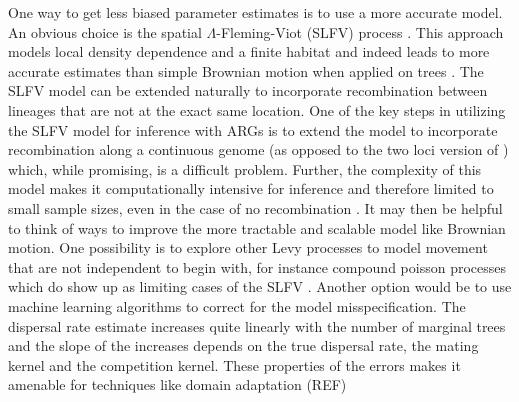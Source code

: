 One way to get less biased parameter estimates is to use a more accurate model. An obvious choice is the spatial $\Lambda$-Fleming-Viot (SLFV) process \citep{barton2010new,barton2010newEvol}. This approach models local density dependence and a finite habitat and indeed leads to more accurate estimates than simple Brownian motion when applied on trees \citep{kalkauskas2021sampling}. The SLFV model can be extended naturally to incorporate recombination \citep{barton2010newEvol,etheridge2012spatial} between lineages that are not at the exact same location. One of the key steps in utilizing the SLFV model for inference with ARGs is to extend the model to incorporate recombination along a continuous genome (as opposed to the two loci version of \cite{etheridge2012spatial}) which, while promising, is a difficult problem. Further, the complexity of this model makes it computationally intensive for inference and therefore limited to small sample sizes, even in the case of no recombination \citep{Wirtz2023}. It may then be helpful to think of ways to improve the more tractable and scalable model like Brownian motion. One possibility is to explore other Levy processes to model movement that are not independent to begin with, for instance compound poisson processes which do show up as limiting cases of the SLFV \citep{barton2010new}.
Another option would be to use machine learning algorithms to correct for the model misspecification. The dispersal rate estimate increases quite linearly with the number of marginal trees and the slope of the increases depends on the true dispersal rate, the mating kernel and the competition kernel. These properties of the errors makes it amenable for techniques like domain adaptation (REF)



